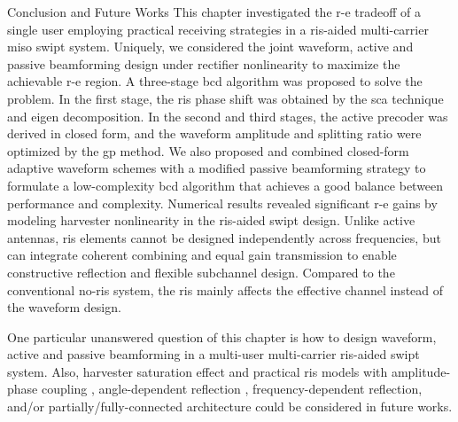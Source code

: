 \begin{section}{Conclusion and Future Works}\label{se:conclusion_and_future_works}
	This chapter investigated the \gls{r-e} tradeoff of a single user employing practical receiving strategies in a \gls{ris}-aided multi-carrier \gls{miso} \gls{swipt} system. Uniquely, we considered the joint waveform, active and passive beamforming design under rectifier nonlinearity to maximize the achievable \gls{r-e} region. A three-stage \gls{bcd} algorithm was proposed to solve the problem. In the first stage, the \gls{ris} phase shift was obtained by the \gls{sca} technique and eigen decomposition. In the second and third stages, the active precoder was derived in closed form, and the waveform amplitude and splitting ratio were optimized by the \gls{gp} method. We also proposed and combined closed-form adaptive waveform schemes with a modified passive beamforming strategy to formulate a low-complexity \gls{bcd} algorithm that achieves a good balance between performance and complexity. Numerical results revealed significant \gls{r-e} gains by modeling harvester nonlinearity in the \gls{ris}-aided \gls{swipt} design. Unlike active antennas, \gls{ris} elements cannot be designed independently across frequencies, but can integrate coherent combining and equal gain transmission to enable constructive reflection and flexible subchannel design. Compared to the conventional no-\gls{ris} system, the \gls{ris} mainly affects the effective channel instead of the waveform design.

	One particular unanswered question of this chapter is how to design waveform, active and passive beamforming in a multi-user multi-carrier \gls{ris}-aided \gls{swipt} system. Also, harvester saturation effect and practical \gls{ris} models with amplitude-phase coupling \cite{Abeywickrama2020}, angle-dependent reflection \cite{Tang2021}, frequency-dependent reflection, and/or partially/fully-connected architecture \cite{Shen2020a} could be considered in future works.
\end{section}
